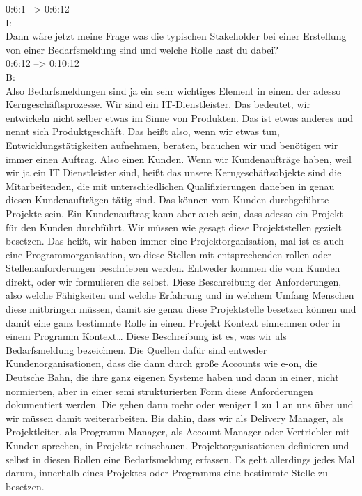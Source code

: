 0:6:1 --> 0:6:12\\
I:\\
Dann wäre jetzt meine Frage was die typischen Stakeholder bei einer Erstellung von einer Bedarfsmeldung sind und welche Rolle hast du dabei?\\

0:6:12 --> 0:10:12\\
B:\\
Also Bedarfsmeldungen sind ja ein sehr wichtiges Element in einem der adesso Kerngeschäftsprozesse. Wir sind ein IT-Dienstleister. Das bedeutet, wir entwickeln nicht selber etwas im Sinne von Produkten. Das ist etwas anderes und nennt sich Produktgeschäft. Das heißt also, wenn wir etwas tun, Entwicklungstätigkeiten aufnehmen, beraten, brauchen wir und benötigen wir immer einen Auftrag. Also einen Kunden. Wenn wir Kundenaufträge haben, weil wir ja ein IT Dienstleister sind, heißt das unsere Kerngeschäftsobjekte sind die Mitarbeitenden, die mit unterschiedlichen Qualifizierungen daneben in genau diesen Kundenaufträgen tätig sind. Das können vom Kunden durchgeführte Projekte sein. Ein Kundenauftrag kann aber auch sein, dass adesso ein Projekt für den Kunden durchführt. Wir müssen wie gesagt diese Projektstellen gezielt besetzen. Das heißt, wir haben immer eine Projektorganisation, mal ist es auch eine Programmorganisation, wo diese Stellen mit entsprechenden rollen oder Stellenanforderungen beschrieben werden. Entweder kommen die vom Kunden direkt, oder wir formulieren die selbst. Diese Beschreibung der Anforderungen, also welche Fähigkeiten und welche Erfahrung und in welchem Umfang Menschen diese mitbringen müssen, damit sie genau diese Projektstelle besetzen können und damit eine ganz bestimmte Rolle in einem Projekt Kontext einnehmen oder in einem Programm Kontext… Diese Beschreibung ist es, was wir als Bedarfsmeldung bezeichnen. Die Quellen dafür sind entweder Kundenorganisationen, dass die dann durch große Accounts wie e-on, die Deutsche Bahn, die ihre ganz eigenen Systeme haben und dann in einer, nicht normierten, aber in einer semi strukturierten Form diese Anforderungen dokumentiert werden. Die gehen dann mehr oder weniger 1 zu 1 an uns über und wir müssen damit weiterarbeiten. Bis dahin, dass wir als Delivery Manager, als Projektleiter, als Programm Manager, als Account Manager oder Vertriebler mit Kunden sprechen, in Projekte reinschauen, Projektorganisationen definieren und selbst in diesen Rollen eine Bedarfsmeldung erfassen. Es geht allerdings jedes Mal darum, innerhalb eines Projektes oder Programms eine bestimmte Stelle zu besetzen.\\

